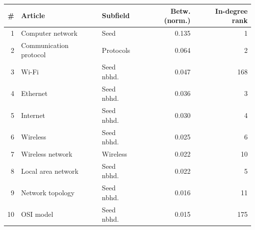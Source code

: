 
\begin{tabular}{rllrr}
\toprule
\# & Article & Subfield & Betw. (norm.) & In-degree rank\\
\midrule
1 & Computer network & Seed & 0.135 & 1\\
2 & Communication protocol & Protocols & 0.064 & 2\\
3 & Wi-Fi & Seed nbhd. & 0.047 & 168\\
4 & Ethernet & Seed nbhd. & 0.036 & 3\\
5 & Internet & Seed nbhd. & 0.030 & 4\\
6 & Wireless & Seed nbhd. & 0.025 & 6\\
7 & Wireless network & Wireless & 0.022 & 10\\
8 & Local area network & Seed nbhd. & 0.022 & 5\\
9 & Network topology & Seed nbhd. & 0.016 & 11\\
10 & OSI model & Seed nbhd. & 0.015 & 175\\
\bottomrule
\end{tabular}
